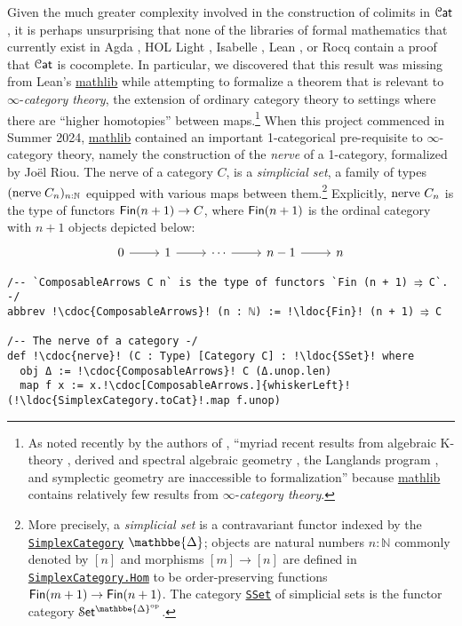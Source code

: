 \documentclass[a4paper,UKenglish,cleveref, autoref, thm-restate]{lipics-v2021}
\newcommand{\op}{\textup{op}}
\newcommand{\nerve}{\textup{nerve}}
\newcommand{\cat}[1]{\textup{\textsf{#1}}}%
\newcommand{\NN}{\mathbb{N}}
\newcommand{\1}{\mathbbe{1}}
\newcommand{\2}{\mathbbe{2}}
\newcommand{\3}{\mathbbe{3}}
\newcommand{\DDelta}{\mathbbe{\Delta}}
\newcommand{\Fin}{\cat{Fin}}
\newcommand{\Cat}{\mathcal{C}\cat{at}}
\newcommand{\Set}{\mathcal{S}\cat{et}}
\newcommand{\libmathlib}{\href{https://github.com/leanprover-community/mathlib}{\textsf{mathlib}}}
\newcommand{\ldoc}[2][]{\href{https://leanprover-community.github.io/mathlib4_docs/find/?pattern=#1#2\#doc}{\texttt{#2}}}
\newcommand{\cdoc}[2][]{\href{https://leanprover-community.github.io/mathlib4_docs/find/?pattern=CategoryTheory.#1#2\#doc}{\texttt{#2}}}
\begin{document}
Given the much greater complexity involved in the construction of colimits in $\Cat$, it is perhaps unsurprising that none of the libraries of formal mathematics that currently exist in Agda \cite{hott-in:agda, HuCarette2021, 1Lab, agda-unimath, VezzosiMoertbergAbel2021}, HOL Light \cite{Harrison2009}, Isabelle \cite{CZH_Foundations-AFP, CZH_Elementary_Categories-AFP, CZH_Universal_Constructions-AFP, NipkoWenzelPaulson2002}, Lean \cite{mathlib2020}, or Rocq \cite{BauerGrossLumsdaineShulmanSozeauSpitters2017,GrossChlipalaSpivak, UniMath} contain a proof that $\Cat$ is cocomplete. In particular, we discovered that this result was missing from Lean's \libmathlib{} while attempting to formalize a theorem that is relevant to $\infty$-\emph{category theory}, the extension of ordinary category theory to settings where there are ``higher homotopies'' between maps.\footnote{As noted recently by the authors of \cite{KRW}, ``myriad recent results from algebraic K-theory \cite{BlumbergGepnerTabuada2013}, derived and spectral algebraic geometry \cite{Lurie2004,Lurie:2018sag}, the Langlands program \cite{FarguesScholze2021}, and symplectic geometry \cite{NadlerTanaka2020} are inaccessible to formalization'' because \libmathlib{}  contains relatively few results from $\infty$-\emph{category theory}.} When this project commenced in Summer 2024, \libmathlib{} contained an important 1-categorical pre-requisite to $\infty$-category theory, namely the construction of the \emph{nerve} of a 1-category, formalized by Jo\"{e}l Riou. The nerve of a category $C$, is a \emph{simplicial set}, a family of types $(\nerve\;C_n)_{n : \NN}$ equipped with various maps between them.\footnote{More precisely, a \emph{simplicial set} is a contravariant functor indexed by the \ldoc{SimplexCategory} $\DDelta$; objects are natural numbers $n : \NN$ commonly denoted by $[n]$ and morphisms $[m] \to [n]$ are defined in \ldoc{SimplexCategory.Hom} to be order-preserving functions $\Fin(m+1) \to \Fin(n+1)$. The category \ldoc{SSet} of simplicial sets is the functor category $\Set^{\DDelta^\op}$.} Explicitly, $\nerve\ C_n$ is the type of functors $\Fin(n+1)\to C$, where $\Fin(n+1)$ is the ordinal category with $n+1$ objects depicted below:
\[ \begin{tikzcd} 0 \arrow[r] & 1 \arrow[r]  & \cdots \arrow[r] & n-1 \arrow[r] &  n \end{tikzcd} \]
\begin{lstlisting}
/-- `ComposableArrows C n` is the type of functors `Fin (n + 1) ⥤ C`. -/
abbrev !\cdoc{ComposableArrows}! (n : ℕ) := !\ldoc{Fin}! (n + 1) ⥤ C

/-- The nerve of a category -/
def !\cdoc{nerve}! (C : Type) [Category C] : !\ldoc{SSet}! where
  obj Δ := !\cdoc{ComposableArrows}! C (Δ.unop.len)
  map f x := x.!\cdoc[ComposableArrows.]{whiskerLeft}! (!\ldoc{SimplexCategory.toCat}!.map f.unop)
\end{lstlisting}
\end{document}

